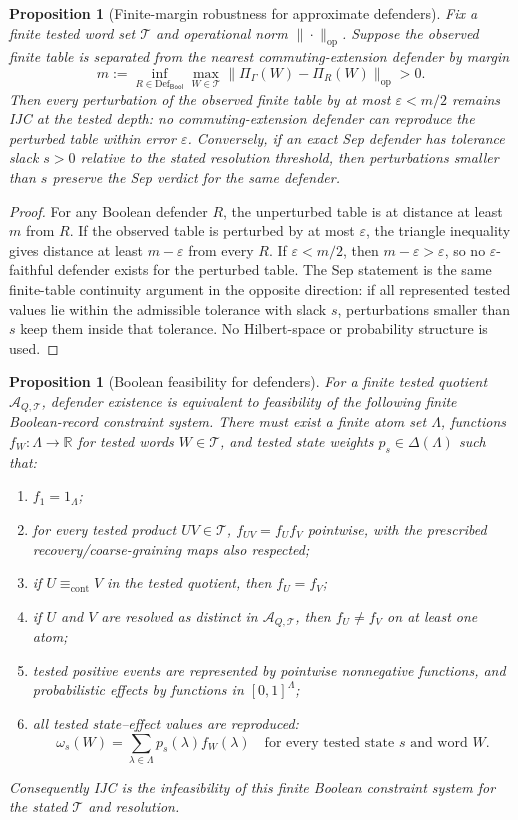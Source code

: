 \documentclass[11pt]{article}
\newtheorem{proposition}[theorem]{Proposition}
\newcommand{\Def}{\mathrm{Def}}
\newcommand{\Bool}{\mathsf{Bool}}
\newcommand{\AQtest}{\mathcal A_{Q,\mathcal T}}
\begin{document}
\begin{proposition}[Finite-margin robustness for approximate defenders]\label{prop:finite-margin-robustness}
Fix a finite tested word set $\mathcal T$ and operational norm $\|\cdot\|_{\mathrm{op}}$.  Suppose the observed finite table is separated from the nearest commuting-extension defender by margin
\[
 m:=\inf_{R\in\Def_{\Bool}}\max_{W\in\mathcal T}
 \|\Pi_\Gamma(W)-\Pi_R(W)\|_{\mathrm{op}}>0 .
\]
Then every perturbation of the observed finite table by at most $\varepsilon<m/2$ remains IJC at the tested depth: no commuting-extension defender can reproduce the perturbed table within error $\varepsilon$.
Conversely, if an exact Sep defender has tolerance slack $s>0$ relative to the stated resolution threshold, then perturbations smaller than $s$ preserve the Sep verdict for the same defender.
\end{proposition}
\begin{proof}
For any Boolean defender $R$, the unperturbed table is at distance at least $m$ from $R$.  If the observed table is perturbed by at most $\varepsilon$, the triangle inequality gives distance at least $m-\varepsilon$ from every $R$.  If $\varepsilon<m/2$, then $m-\varepsilon>\varepsilon$, so no $\varepsilon$-faithful defender exists for the perturbed table.  The Sep statement is the same finite-table continuity argument in the opposite direction: if all represented tested values lie within the admissible tolerance with slack $s$, perturbations smaller than $s$ keep them inside that tolerance.  No Hilbert-space or probability structure is used.
\end{proof}
\begin{proposition}[Boolean feasibility for defenders]\label{prop:boolean-feasibility-criterion}
For a finite tested quotient $\AQtest$, defender existence is equivalent to feasibility of the following finite Boolean-record constraint system.  There must exist a finite atom set $\Lambda$, functions $f_W:\Lambda\to\mathbb R$ for tested words $W\in\mathcal T$, and tested state weights $p_s\in\Delta(\Lambda)$ such that:
\begin{enumerate}[label=(\roman*),leftmargin=2em]
\item $f_1=1_\Lambda$;
\item for every tested product $UV\in\mathcal T$, $f_{UV}=f_U f_V$ pointwise, with the prescribed recovery/coarse-graining maps also respected;
\item if $U\equiv_{\mathrm{cont}}V$ in the tested quotient, then $f_U=f_V$;
\item if $U$ and $V$ are resolved as distinct in $\AQtest$, then $f_U\ne f_V$ on at least one atom;
\item tested positive events are represented by pointwise nonnegative functions, and probabilistic effects by functions in $[0,1]^\Lambda$;
\item all tested state--effect values are reproduced:
\[
  \omega_s(W)=\sum_{\lambda\in\Lambda}p_s(\lambda)f_W(\lambda)
  \quad\text{for every tested state }s\text{ and word }W.
\]
\end{enumerate}
Consequently IJC is the infeasibility of this finite Boolean constraint system for the stated $\mathcal T$ and resolution.
\end{proposition}
\end{document}
